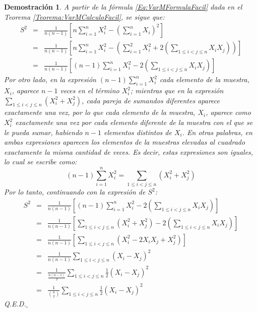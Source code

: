 \documentclass[a4paper,11pt]{article}
\theoremstyle{teoremas}
\theoremstyle{ejemplos}
\theoremstyle{definiciones}
\theoremstyle{lemas}
\newtheorem*{demostracion}{Demostraci\'on}
\begin{document}
\begin{demostracion}
 A partir de la f\'ormula \ref{Eq:VarMFormulaFacil} dada en el Teorema \ref{Teorema:VarMCalculoFacil}, se sigue que:
 \begin{eqnarray*}
  S^2 & = & \frac{1}{n(n-1)} \left[ n\sum_{i=1}^n X_i^2 - \left( \sum_{i=1}^n X_i \right)^2 \right] \\
      & = & \frac{1}{n(n-1)} \left[ n\sum_{i=1}^n X_i^2 - \left( \sum_{i=1}^2 X_i^2 + 2\left( \sum_{1\leq i < j \leq n}X_iX_j \right) \right) \right] \\ 
      & = & \frac{1}{n(n-1)} \left[(n-1)\sum_{i=1}^n X_i^2 - 2\left( \sum_{1\leq i < j \leq n} X_iX_j \right) \right]
 \end{eqnarray*}
 Por otro lado, en la expresi\'on $\displaystyle{ (n-1)\sum_{i=1}^n X_i^2 }$ cada elemento de la muestra, $X_i$, aparece $n-1$ veces en el t\'ermino $X_i^2$; mientras que en la expresi\'on $\displaystyle{ \sum_{1\leq i < j \leq n} \left( X_i^2 + X_j^2 \right) }$, cada pareja de sumandos diferentes aparece exactamente una vez, por lo que cada elemento de la muestra, $X_i$, aparece como $X_i^2$ exactamente una vez por cada elemento diferente de la muestra con el que se le pueda sumar, habiendo $n-1$ elementos distintos de $X_i$. En otras palabras, en ambas expresiones aparecen los elementos de la muestras elevadas al cuadrado exactamente la misma cantidad de veces. Es decir, estas expresiones son iguales, lo cual se escribe como:
 \begin{equation*}
  (n-1)\sum_{i=1}^n X_i^2 = \sum_{1\leq i < j \leq n} \left( X_i^2 + X_j^2 \right)
 \end{equation*}
 Por lo tanto, continuando con la expresi\'on de $S^2$:
 \begin{eqnarray*}
  S^2 & = & \frac{1}{n(n-1)} \left[(n-1)\sum_{i=1}^n X_i^2 - 2\left( \sum_{1\leq i < j \leq n} X_iX_j \right) \right] \\ 
      & = & \frac{1}{n(n-1)} \left[ \sum_{1\leq i < j \leq n} \left( X_i^2 + X_j^2 \right) - 2\left( \sum_{1\leq i < j \leq n} X_iX_j \right) \right] \\
      & = & \frac{1}{n(n-1)} \left[ \sum_{1\leq i < j \leq n} \left( X_i^2 - 2X_iX_j + X_j^2 \right) \right] \\
      & = & \frac{1}{n(n-1)} \sum_{1 \leq i < j \leq n} \left( X_i - X_j \right)^2 \\ 
      & = & \frac{1}{\frac{n(n-1)}{2}} \sum_{1 \leq i < j \leq n} \frac{1}{2} \left( X_i - X_j \right)^2 \\ 
      & = & \frac{1}{\binom{n}{2}} \sum_{1 \leq i < j \leq n} \frac{1}{2} \left( X_i - X_j \right)^2
 \end{eqnarray*}
 Q.E.D.${}_{\square}$
\end{demostracion}
\end{document}
